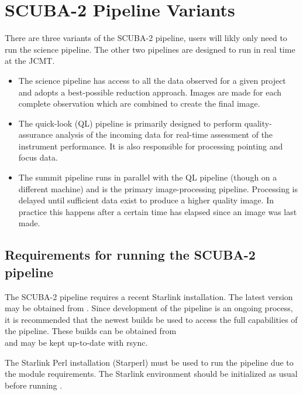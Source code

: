 \section{SCUBA-2 Pipeline Variants\label{se:pipelines}}

There are three variants of the SCUBA-2 pipeline, users will likly only need
to run the science pipeline. The other two pipelines are designed to run in
real time at the JCMT. 

\begin{itemize}
\item The science pipeline has access to all the data observed for a
  given project and adopts a best-possible reduction approach. Images
  are made for each complete observation which are combined to create
  the final image.

\item The quick-look (QL) pipeline is primarily designed to perform
  quality-assurance analysis of the incoming data for real-time
  assessment of the instrument performance. It is also responsible for
  processing pointing and focus data.

\item The summit pipeline runs in parallel with the QL pipeline
  (though on a different machine) and is the primary image-processing
  pipeline. Processing is delayed until sufficient data exist to
  produce a higher quality image. In practice this happens after a
  certain time has elapsed since an image was last made.
\end{itemize}

\subsection{Requirements for running the SCUBA-2 pipeline}

The SCUBA-2 pipeline requires a recent Starlink installation. The
latest version may be obtained from
. Since
development of the pipeline is an ongoing process, it is recommended
that the newest builds be used to access the full capabilities of the
pipeline. These builds can be obtained from\\
and may be kept up-to-date with rsync.

The Starlink Perl installation (Starperl) must be used to run the
pipeline due to the module requirements. The Starlink environment should be
initialized as usual before running \oracdr.

